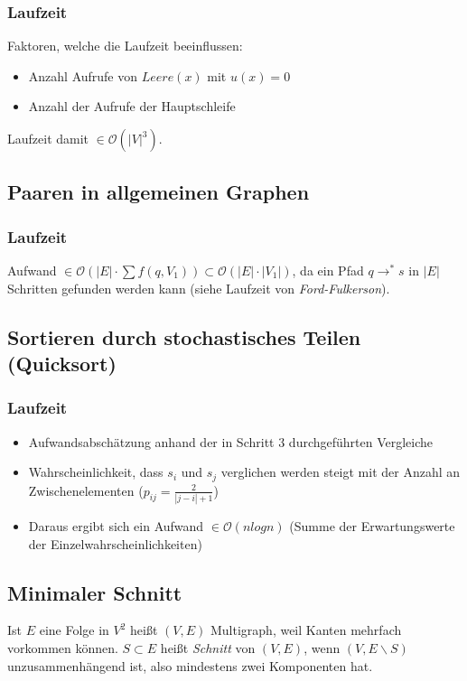 \subsubsection{Laufzeit}
Faktoren, welche die Laufzeit beeinflussen:
\begin{itemize}
	\item Anzahl Aufrufe von \(Leere(x)\) mit \(u(x) = 0\)
	\item Anzahl der Aufrufe der Hauptschleife
\end{itemize}
Laufzeit damit \(\in \mathcal{O}(|V|^3)\).



\subsection{Paaren in allgemeinen Graphen}


\subsubsection{Laufzeit}
Aufwand \(\in \mathcal{O}(|E|\cdot \sum f(q, V_1)) \subset \mathcal{O}(|E| \cdot |V_1|)\), da ein Pfad \(q \rightarrow^* s\) in \(|E|\) Schritten gefunden werden kann (siehe Laufzeit von \textit{Ford-Fulkerson}).


\subsection{Sortieren durch stochastisches Teilen (Quicksort)}


\subsubsection{Laufzeit}
\begin{itemize}
	\item Aufwandsabschätzung anhand der in Schritt 3 durchgeführten Vergleiche
	\item Wahrscheinlichkeit, dass \(s_i\) und \(s_j\) verglichen werden steigt mit der Anzahl an Zwischenelementen (\(p_{ij}=\frac{2}{|j-i|+1}\))
	\item Daraus ergibt sich ein Aufwand \(\in \mathcal{O}(nlogn)\) (Summe der Erwartungswerte der Einzelwahrscheinlichkeiten)
\end{itemize}


\subsection{Minimaler Schnitt}
Ist \(E\) eine Folge in \(V^2\) heißt \((V,E)\) Multigraph, weil Kanten mehrfach vorkommen können. \(S \subset E\) heißt \textit{Schnitt} von \((V,E)\), wenn \((V, E \backslash S)\) unzusammenhängend ist, also mindestens zwei Komponenten hat.



